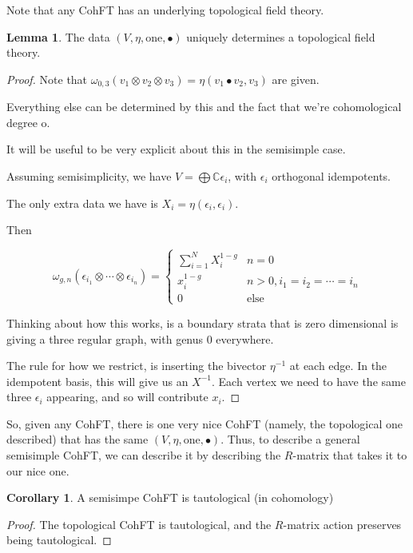 \documentclass{amsart}
\theoremstyle{definition}
\newtheorem{lemma}{Lemma}
\newtheorem{corollary}{Corollary}
\newcommand{\C}{\mathbb{C}}
\newcommand{\one}{\text{one}}
\begin{document}
Note that any CohFT has an underlying topological field theory.  
\begin{lemma}
The data $(V,\eta,\one,\bullet)$ uniquely determines a topological field theory.
\end{lemma}
\begin{proof} 
Note that $\omega_{0,3}(v_1\otimes v_2\otimes v_3)=\eta(v_1\bullet v_2,v_3)$ are given.

Everything else can be determined by this and the fact that we're cohomological degree o.

It will be useful to be very explicit about this in the semisimple case.

Assuming semisimplicity, we have $V=\bigoplus \C \epsilon_i$, with $\epsilon_i$ orthogonal idempotents.

The only extra data we have is $X_i=\eta(\epsilon_i,\epsilon_i)$.

Then 

$$\omega_{g,n}(\epsilon_{i_1}\otimes\cdots\otimes\epsilon_{i_n})=\left\{\begin{array}{ll} \sum_{i=1}^N X_i^{1-g} & n=0 \\
x_i^{1-g} & n>0, i_1=i_2=\cdots=i_n \\
0 & \text{else}
\end{array}
\right.
$$ 

Thinking about how this works, is a boundary strata that is zero dimensional is giving a three regular graph, with genus 0 everywhere.

The rule for how we restrict, is inserting the bivector $\eta^{-1}$ at each edge.  In the idempotent basis, this will give us an $X^{-1}$.  Each vertex we need to have the same three $\epsilon_i$ appearing, and so will contribute $x_i$.

\end{proof}

So, given any CohFT, there is one very nice CohFT (namely, the topological one described) that has the same $(V, \eta, \one,\bullet)$.  Thus, to describe a general semisimple CohFT, we can describe it by describing the $R$-matrix that takes it to our nice one.

\begin{corollary}
A semisimpe CohFT is tautological (in cohomology)
\end{corollary}

\begin{proof}
The topological CohFT is tautological, and the $R$-matrix action preserves being tautological.
\end{proof}
\end{document}
